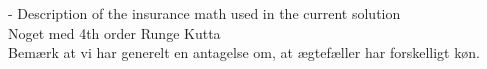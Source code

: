 - Description of the insurance math used in the current solution \\
Noget med 4th order Runge Kutta \\
Bemærk at vi har generelt en antagelse om, at ægtefæller har forskelligt køn.